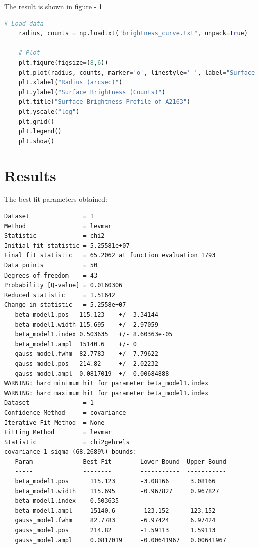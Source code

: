 \documentclass[a4paper,12pt]{article}
\begin{document}
The result is shown in figure - \ref{}

\begin{lstlisting}[language=python]
    # Load data
    radius, counts = np.loadtxt("brightness_curve.txt", unpack=True)
    
    # Plot
    plt.figure(figsize=(8,6))
    plt.plot(radius, counts, marker='o', linestyle='-', label="Surface Brightness")
    plt.xlabel("Radius (arcsec)")
    plt.ylabel("Surface Brightness (Counts)")
    plt.title("Surface Brightness Profile of A2163")
    plt.yscale("log")
    plt.grid()
    plt.legend()
    plt.show()
\end{lstlisting}

\section{Results}
The best-fit parameters obtained:
\begin{lstlisting}
Dataset               = 1
Method                = levmar
Statistic             = chi2
Initial fit statistic = 5.25581e+07
Final fit statistic   = 65.2062 at function evaluation 1793
Data points           = 50
Degrees of freedom    = 43
Probability [Q-value] = 0.0160306
Reduced statistic     = 1.51642
Change in statistic   = 5.2558e+07
   beta_model1.pos   115.123    +/- 3.34144     
   beta_model1.width 115.695    +/- 2.97059     
   beta_model1.index 0.503635   +/- 8.60363e-05 
   beta_model1.ampl  15140.6    +/- 0           
   gauss_model.fwhm  82.7783    +/- 7.79622     
   gauss_model.pos   214.82     +/- 2.02232     
   gauss_model.ampl  0.0817019  +/- 0.00684888  
WARNING: hard minimum hit for parameter beta_model1.index
WARNING: hard maximum hit for parameter beta_model1.index
Dataset               = 1
Confidence Method     = covariance
Iterative Fit Method  = None
Fitting Method        = levmar
Statistic             = chi2gehrels
covariance 1-sigma (68.2689%) bounds:
   Param              Best-Fit        Lower Bound  Upper Bound
   -----              --------        -----------  -----------
   beta_model1.pos      115.123       -3.08166      3.08166
   beta_model1.width    115.695       -0.967827     0.967827
   beta_model1.index    0.503635        -----        -----
   beta_model1.ampl     15140.6       -123.152      123.152
   gauss_model.fwhm     82.7783       -6.97424      6.97424
   gauss_model.pos      214.82        -1.59113      1.59113
   gauss_model.ampl     0.0817019     -0.00641967   0.00641967
\end{lstlisting}
\end{document}
